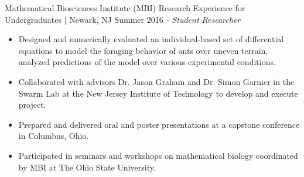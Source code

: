 Mathematical Biosciences Institute (MBI) Research Experience for Undergraduates | Newark, NJ \hfill Summer 2016 \newline
\textit{- Student Researcher} \\
  \vspace{-4.5mm}
 \begin{itemize}
 \item Designed and numerically evaluated an individual-based set of differential equations to model the foraging behavior of ants over uneven terrain, analyzed predictions of the model over various experimental conditions.
  \item Collaborated with advisors Dr. Jason Graham and Dr. Simon Garnier in the Swarm Lab at the New Jersey Institute of Technology to develop and execute project.
 \item Prepared and delivered oral and poster presentations at a capstone conference in Columbus, Ohio.
 \item Participated in seminars and workshops on mathematical biology coordinated by MBI at The Ohio State University.
 \end{itemize}
  \vspace{-3.5mm}

